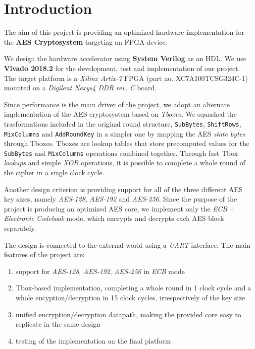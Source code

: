\section{Introduction}

The aim of this project is providing an optimized hardware implementation for the
\textbf{AES Cryptosystem} targeting an FPGA device.

We design the hardware accelerator using \textbf{System Verilog} as an HDL. We use
\textbf{Vivado 2018.2} for the development, test and implementation of our project.
The target platform is a \textit{Xilinx Artix-7} FPGA (part no. XC7A100TCSG324C-1)
mounted on a \textit{Digilent Nexys4 DDR rev. C} board.

Since performance is the main driver of the project, we adopt an alternate implementation
of the AES cryptosystem based on \textit{Tboxes}. We squashed the trasformations
included in the original round structure, \texttt{SubBytes}, \texttt{ShiftRows},
\texttt{MixColumns} and \texttt{AddRoundKey} in a simpler one by mapping the AES
\textit{state bytes} through Tboxes. Tboxes are lookup tables that store precomputed
values for the \texttt{SubBytes} and \texttt{MixColumns} operations combined together.
Through fast Tbox \textit{lookups} and simple \textit{XOR} operations, it is possible
to complete a whole round of the cipher in a single clock cycle.

Another design criterion is providing support for all of the three different AES key sizes,
namely \textit{AES-128}, \textit{AES-192} and \textit{AES-256}.
Since the purpose of the project is producing an optimized AES core, we implement only
the \textit{ECB -- Electronic Codebook} mode, which encrypts
and decrypts each AES block separately.

The design is connected to the external world using a \textit{UART} interface.
The main features of the project are:
\begin{enumerate}
  \item support for \textit{AES-128}, \textit{AES-192}, \textit{AES-256} in \textit{ECB} mode
  \item Tbox-based implementation, completing a whole round in 1 clock cycle and
a whole encyption/decryption in 15 clock cycles, irrespectively of the key size
  \item unified encryption/decryption datapath, making the provided core easy to
replicate in the same design
  \item testing of the implementation on the final platform
\end{enumerate}
